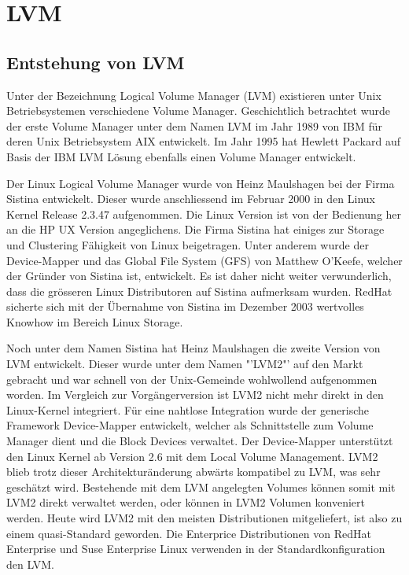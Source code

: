 \chapter{LVM}
\label{cha:VM}



\section{Entstehung von LVM}
Unter der Bezeichnung Logical Volume Manager (LVM) existieren unter Unix Betriebsystemen verschiedene Volume Manager. Geschichtlich betrachtet wurde der erste Volume Manager unter dem Namen LVM im Jahr 1989 von IBM für deren Unix Betriebsystem AIX entwickelt. Im Jahr 1995 hat Hewlett Packard auf Basis der IBM LVM Lösung ebenfalls einen Volume Manager entwickelt.

Der Linux Logical Volume Manager wurde von Heinz Maulshagen bei der Firma Sistina entwickelt. Dieser wurde anschliessend im Februar 2000 in den Linux Kernel Release 2.3.47 aufgenommen.
Die Linux Version ist von der Bedienung her an die HP UX Version angeglichens. Die Firma Sistina hat einiges zur Storage und Clustering Fähigkeit von Linux beigetragen. Unter anderem wurde der Device-Mapper und das Global File System (GFS) von Matthew O'Keefe, welcher der Gründer von Sistina ist, entwickelt.
Es ist daher nicht weiter verwunderlich, dass die grösseren Linux Distributoren auf Sistina aufmerksam wurden. RedHat sicherte sich mit der Übernahme von Sistina im Dezember 2003 wertvolles Knowhow im Bereich Linux Storage. 

Noch unter dem Namen Sistina hat Heinz Maulshagen die zweite Version von LVM entwickelt. Dieser wurde unter dem Namen "'LVM2"' auf den Markt gebracht und war schnell von der Unix-Gemeinde wohlwollend aufgenommen worden. Im Vergleich zur Vorgängerversion ist LVM2 nicht mehr direkt in den Linux-Kernel integriert. Für eine nahtlose Integration wurde der generische Framework Device-Mapper entwickelt, welcher als Schnittstelle zum Volume Manager dient und die Block Devices verwaltet. Der Device-Mapper unterstützt den Linux Kernel ab Version 2.6 mit dem Local Volume Management. LVM2 blieb trotz dieser Architekturänderung abwärts kompatibel zu LVM, was sehr geschätzt wird. Bestehende mit dem LVM angelegten Volumes können somit mit LVM2 direkt verwaltet werden, oder können in LVM2 Volumen konveniert werden. Heute wird LVM2 mit den meisten Distributionen mitgeliefert, ist also zu einem quasi-Standard geworden. Die Enterprice Distributionen von RedHat Enterprise und Suse Enterprise Linux verwenden in der Standardkonfiguration den LVM. 

